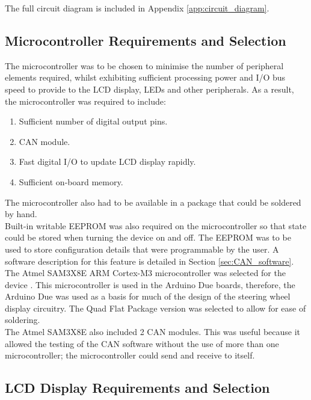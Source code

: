 \documentclass[a4paper,12pt]{article}
\begin{document}
The full circuit diagram is included in Appendix \ref{app:circuit_diagram}.

\subsection{Microcontroller Requirements and Selection}
\label{sec:microcontroller}

The microcontroller was to be chosen to minimise the number of peripheral elements required, whilst exhibiting sufficient processing power and I/O bus speed to provide to the LCD display, LEDs and other peripherals. As a result, the microcontroller was required to include:

\begin{enumerate}
  \item Sufficient number of digital output pins.
  \item CAN module.
  \item Fast digital I/O to update LCD display rapidly.
  \item Sufficient on-board memory.
\end{enumerate}

The microcontroller also had to be available in a package that could be soldered by hand. \\

Built-in writable EEPROM was also required on the microcontroller so that state could be stored when turning the device on and off. The EEPROM was to be used to store configuration details that were programmable by the user. A software description for this feature is detailed in Section \ref{sec:CAN_software}. \\

The Atmel SAM3X8E ARM Cortex-M3 microcontroller was selected for the device \cite{microcontroller}. This microcontroller is used in the Arduino Due boards, therefore, the Arduino Due was used as a basis for much of the design of the steering wheel display circuitry. The Quad Flat Package version was selected to allow for ease of soldering. \\

The Atmel SAM3X8E also included 2 CAN modules. This was useful because it allowed the testing of the CAN software without the use of more than one microcontroller; the microcontroller could send and receive to itself. \\

\subsection{LCD Display Requirements and Selection}
\label{sec:display}
\end{document}
